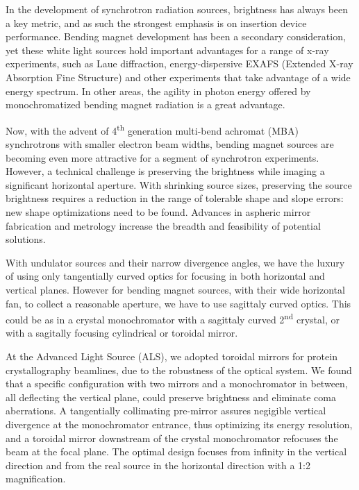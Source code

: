 \documentclass[preprint]{iucr}       %
\newcommand{\inred}[1]{{\color{red}#1}}
\begin{document}
In the development of synchrotron radiation sources, brightness has always been a key metric, and as such the strongest emphasis is on insertion device performance. Bending magnet development has been a secondary consideration, yet these white light sources hold important advantages for a range of x-ray experiments, such as Laue diffraction, energy-dispersive EXAFS (Extended X-ray Absorption Fine Structure) and other experiments that take advantage of a wide energy spectrum. In other areas, the agility in photon energy offered by monochromatized bending magnet radiation is a great advantage. 

Now, with the advent of 4\textsuperscript{th} generation multi-bend achromat (MBA) synchrotrons with smaller electron beam widths, bending magnet sources are becoming even more attractive for a segment of synchrotron experiments. However, a technical challenge is preserving the brightness while imaging a significant horizontal aperture. With shrinking source sizes, preserving the source brightness requires a reduction in the range of tolerable shape and slope errors: new shape optimizations need to be found. Advances in aspheric mirror fabrication and metrology increase the breadth and feasibility of potential solutions.

With undulator sources and their narrow divergence angles, we have the luxury of using only tangentially curved optics for focusing in both horizontal and vertical planes. However for bending magnet sources, with their wide horizontal fan, to collect a reasonable aperture, we have to use sagittaly curved optics. This could be as in a crystal monochromator with a sagittaly curved 2\textsuperscript{nd} crystal, or with a sagitally focusing cylindrical or toroidal mirror.

At the Advanced Light Source (ALS), we adopted toroidal mirrors for protein crystallography beamlines, due to the robustness of the optical system. We found that a specific configuration \inred{with two mirrors and a monochromator in between, all deflecting  the vertical plane,} could preserve brightness and eliminate coma aberrations. 
A tangentially collimating pre-mirror \inred{assures negigible vertical divergence at the monochromator entrance, thus optimizing its energy resolution,} and a toroidal mirror downstream of the crystal monochromator \inred{refocuses the beam at the focal plane.} The optimal design focuses from infinity in the vertical direction and from the real source in the horizontal direction with a 1:2 magnification.
\end{document}
